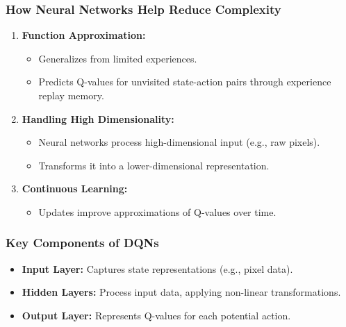 \documentclass[aspectratio=169]{beamer}
\begin{document}
\begin{frame}[fragile]
    \frametitle{How Neural Networks Help Reduce Complexity}
    \begin{enumerate}
        \item \textbf{Function Approximation:}
        \begin{itemize}
            \item Generalizes from limited experiences.
            \item Predicts Q-values for unvisited state-action pairs through experience replay memory.
        \end{itemize}

        \item \textbf{Handling High Dimensionality:}
        \begin{itemize}
            \item Neural networks process high-dimensional input (e.g., raw pixels).
            \item Transforms it into a lower-dimensional representation.
        \end{itemize}

        \item \textbf{Continuous Learning:}
        \begin{itemize}
            \item Updates improve approximations of Q-values over time.
        \end{itemize}
    \end{enumerate}
\end{frame}

\begin{frame}[fragile]
    \frametitle{Key Components of DQNs}
    \begin{itemize}
        \item \textbf{Input Layer:} Captures state representations (e.g., pixel data).
        \item \textbf{Hidden Layers:} Process input data, applying non-linear transformations.
        \item \textbf{Output Layer:} Represents Q-values for each potential action.
    \end{itemize}
\end{frame}
\end{document}

